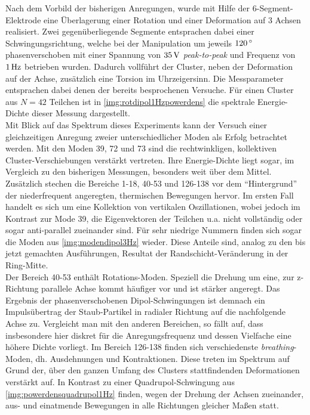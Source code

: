 \documentclass[numbers=noenddot,a4paper,notitlepage,twoside,BCOR15mm]{scrbook}
\newcommand{\degree}{^\circ}
\newcommand{\tilt}[1]{\textit{#1}}
\begin{document}
							Nach dem Vorbild der bisherigen Anregungen, wurde mit Hilfe der 6-Segment-Elektrode eine Überlagerung einer Rotation und einer Deformation auf 3 Achsen realisiert. Zwei gegenüberliegende Segmente entsprachen dabei einer Schwingungsrichtung, welche bei der Manipulation um jeweils $\unit[120]{\degree}$ phasenverschoben mit einer Spannung von $\unit[35]{V}$ \tilt{peak-to-peak} und Frequenz von $\unit[1]{Hz}$ betrieben wurden. Dadurch vollführt der Cluster, neben der Deformation auf der Achse, zusätzlich eine Torsion im Uhrzeigersinn. Die Messparameter entsprachen dabei denen der bereits besprochenen Versuche. Für einen Cluster aus $N=42$ Teilchen ist in \ref{img:rotdipol1Hzpowerdens} die spektrale Energie-Dichte dieser Messung dargestellt.\\
							Mit Blick auf das Spektrum dieses Experiments kann der Versuch einer gleichzeitigen Anregung zweier unterschiedlicher Moden als Erfolg betrachtet werden. Mit den Moden 39, 72 und 73 sind die rechtwinkligen, kollektiven Cluster-Verschiebungen verstärkt vertreten. Ihre Energie-Dichte liegt sogar, im Vergleich zu den bisherigen Messungen, besonders weit über dem Mittel. Zusätzlich stechen die Bereiche 1-18, 40-53 und 126-138 vor dem "`Hintergrund"' der niederfrequent angeregten, thermischen Bewegungen hervor. Im ersten Fall handelt es sich um eine Kollektion von vertikalen Oszillationen, wobei jedoch im Kontrast zur Mode 39, die Eigenvektoren der Teilchen u.a. nicht vollständig oder sogar anti-parallel zueinander sind. Für sehr niedrige Nummern finden sich sogar die Moden aus \ref{img:modendipol3Hz} wieder. Diese Anteile sind, analog zu den bis jetzt gemachten Ausführungen, Resultat der Randschicht-Veränderung in der Ring-Mitte.\\
							Der Bereich 40-53 enthält Rotations-Moden. Speziell die Drehung um eine, zur z-Richtung parallele Achse kommt häufiger vor und ist stärker angeregt. Das Ergebnis der phasenverschobenen Dipol-Schwingungen ist demnach ein Impulsübertrag der Staub-Partikel in radialer Richtung auf die nachfolgende Achse zu. Vergleicht man mit den anderen Bereichen, so fällt auf, dass insbesondere hier diskret für die Anregungsfrequenz und dessen Vielfache eine höhere Dichte vorliegt. Im Bereich 126-138 finden sich verschiedenste \tilt{breathing}-Moden, dh. Ausdehnungen und Kontraktionen. Diese treten im Spektrum auf Grund der, über den ganzen Umfang des Clusters stattfindenden Deformationen verstärkt auf. In Kontrast zu einer Quadrupol-Schwingung aus \ref{img:powerdensquadrupol1Hz} finden, wegen der Drehung der Achsen zueinander, aus- und einatmende Bewegungen in alle Richtungen gleicher Maßen statt.
\end{document}
